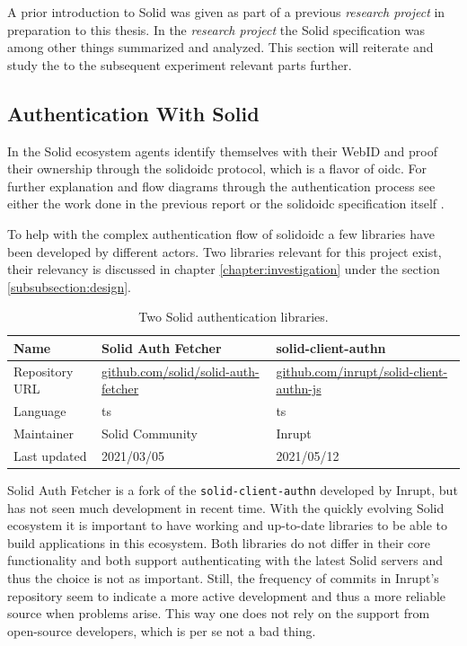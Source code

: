 A prior introduction to Solid was given as part of a previous \textit{research project} \cite{cern-solid-investigation-spec} in preparation to this thesis. In the \textit{research project} the Solid specification was among other things summarized and analyzed. This section will reiterate and study the to the subsequent experiment relevant parts further.

\subsection{Authentication With Solid}

In the Solid ecosystem agents identify themselves with their WebID and proof their ownership through the \gls{solidoidc} protocol, which is a flavor of \gls{oidc}. For further explanation and flow diagrams through the authentication process see either the work done in the previous report \cite{cern-solid-investigation-spec} or the \gls{solidoidc} specification itself \cite{solid-ecosystem-oidc}.

To help with the complex authentication flow of \gls{solidoidc} a few libraries have been developed by different actors. Two libraries relevant for this project exist, their relevancy is discussed in chapter \ref{chapter:investigation} under the section \ref{subsubsection:design}.

\begin{table}[h!]
    \centering
    \begin{tabular}{| l | l | l |} 
     \hline
     Name & Solid Auth Fetcher & solid-client-authn \\
     \hline
     Repository URL & \url{github.com/solid/solid-auth-fetcher} & \url{github.com/inrupt/solid-client-authn-js} \\
     \hline
     Language & \gls{ts} & \gls{ts} \\
     \hline
     Maintainer & Solid Community & Inrupt \\
     \hline
     Last updated & 2021/03/05 & 2021/05/12 \\
     \hline
    \end{tabular}
    \vspace{0.75cm}
    \caption{Two Solid authentication libraries.}
    \label{table:0}
\end{table}

Solid Auth Fetcher is a fork of the \texttt{solid-client-authn} developed by Inrupt, but has not seen much development in recent time. With the quickly evolving Solid ecosystem it is important to have working and up-to-date libraries to be able to build applications in this ecosystem. Both libraries do not differ in their core functionality and both support authenticating with the latest Solid servers and thus the choice is not as important. Still, the frequency of commits in Inrupt's repository seem to indicate a more active development and thus a more reliable source when problems arise. This way one does not rely on the support from open-source developers, which is per se not a bad thing.

